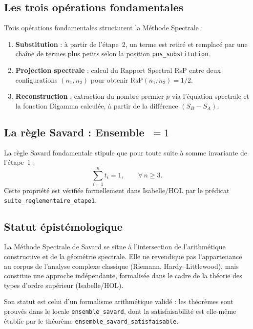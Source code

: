 \documentclass[]{pasj02}
\begin{document}
\subsection{Les trois opérations fondamentales}
\label{ssec:operations}

Trois opérations fondamentales structurent la Méthode Spectrale :

\begin{enumerate}
  \item \textbf{Substitution} : à partir de l'étape~2, un terme est retiré
        et remplacé par une chaîne de termes plus petits selon la position
        \texttt{pos\_substitution}.
  \item \textbf{Projection spectrale} : calcul du Rapport Spectral RsP entre
        deux configurations $(n_1,n_2)$ pour obtenir
        $\mathrm{RsP}(n_1,n_2)=1/2$.
  \item \textbf{Reconstruction} : extraction du nombre premier $p$ via
        l'équation spectrale et la fonction Digamma calculée, à partir de la
        différence $(S_B - S_A)$.
\end{enumerate}

\subsection{La règle Savard : Ensemble~$= 1$}
\label{ssec:regle}

La règle Savard fondamentale stipule que pour toute suite à somme invariante
de l'étape~1 :
\begin{equation}
  \sum_{i=1}^{n} t_i = 1, \qquad \forall\, n \geq 3.
\end{equation}
Cette propriété est vérifiée formellement dans Isabelle/HOL par le prédicat
\texttt{suite\_reglementaire\_etape1}.

\subsection{Statut épistémologique}
\label{ssec:epist}

La Méthode Spectrale de Savard se situe à l'intersection de l'arithmétique
constructive et de la géométrie spectrale.  Elle ne revendique pas
l'appartenance au corpus de l'analyse complexe classique (Riemann,
Hardy--Littlewood), mais constitue une approche indépendante, formalisée
dans le cadre de la théorie des types d'ordre supérieur (Isabelle/HOL).

Son statut est celui d'un formalisme arithmétique validé : les théorèmes
sont prouvés dans le locale \texttt{ensemble\_savard}, dont la
satisfaisabilité est elle-même établie par le théorème
\texttt{ensemble\_savard\_satisfaisable}.
\end{document}
